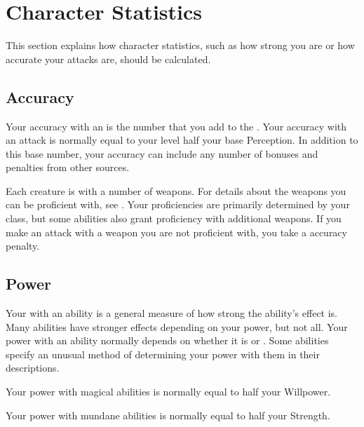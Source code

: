 \section{Character Statistics}
    This section explains how character statistics, such as how strong you are or how accurate your attacks are, should be calculated.

    \subsection{Accuracy}\label{Accuracy}
        Your accuracy with an  is the number that you add to the .
        Your accuracy with an attack is normally equal to your level \add half your base Perception.
        In addition to this base number, your accuracy can include any number of bonuses and penalties from other sources.

         Each creature is  with a number of weapons.
        For details about the weapons you can be proficient with, see .
        Your proficiencies are primarily determined by your class, but some abilities also grant proficiency with additional weapons.
        If you make an attack with a weapon you are not proficient with, you take a  accuracy penalty.

    \subsection{Power}\label{Power}
        Your  with an ability is a general measure of how strong the ability's effect is.
        Many abilities have stronger effects depending on your power, but not all.
        Your power with an ability normally depends on whether it is  or .
        Some abilities specify an unusual method of determining your power with them in their descriptions.

        Your power with magical abilities is normally equal to half your Willpower.

        Your power with mundane abilities is normally equal to half your Strength.

